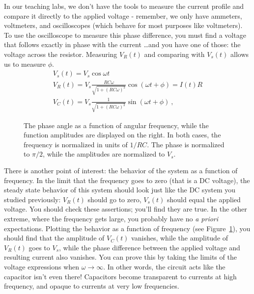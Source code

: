 \documentclass[12pt]{article}
\begin{document}
In our teaching labs, we don't have the tools to measure the current
profile and compare it directly to the applied voltage - remember, we
only have ammeters, voltmeters, and oscilloscopes (which behave for
most purposes like voltmeters).  To use the oscilloscope to measure
this phase difference, you must find a voltage that follows exactly in
phase with the current \ldots and you have one of those: the voltage
across the resistor.  Measuring $V_R(t)$ and comparing with $V_s(t)$
allows us to measure $\phi$.
\begin{gather*}
  V_s(t) = V_s \cos \omega t\\
  V_R(t) = V_s \frac{RC\omega}{\sqrt{1+(RC\omega)^2}} \cos( \omega t
  + \phi) = I(t) R\\
  V_C(t) = V_s \frac{1}{\sqrt{1+(RC\omega)^2}} \sin( \omega t + \phi)\ ,
\end{gather*}

\begin{figure}
  \centering
  \caption{The phase angle as a function of angular frequency, while
    the function amplitudes are displayed on the right.  In both
    cases, the frequency is normalized in units of $1/RC$.  The phase
    is normalized to $\pi/2$, while the amplitudes are normalized to
    $V_s$.}
  \label{fig:frequency}
\end{figure}
There is another point of interest: the behavior of the system as a
function of frequency.  In the limit that the frequency goes to zero
(that is a DC voltage), the steady state behavior of this system
should look just like the DC system you studied previously: $V_R(t)$
should go to zero, $V_s(t)$ should equal the applied voltage.  You
should check these assertions; you'll find they are true.  In the
other extreme, where the frequency gets large, you probably have no
\textit{a priori} expectations.  Plotting the behavior as a function
of frequency (see Figure~\ref{fig:frequency}), you should find that
the amplitude of $V_C(t)$ vanishes, while the amplitude of $V_R(t)$
goes to $V_s$, while the phase difference between the applied voltage
and resulting current also vanishes.  You can prove this by taking the
limits of the voltage expressions when $\omega \to \infty$.  In other
words, the circuit acts like the capacitor isn't even there!
Capacitors become transparent to currents at high frequency, and
opaque to currents at very low frequencies.
\end{document}

